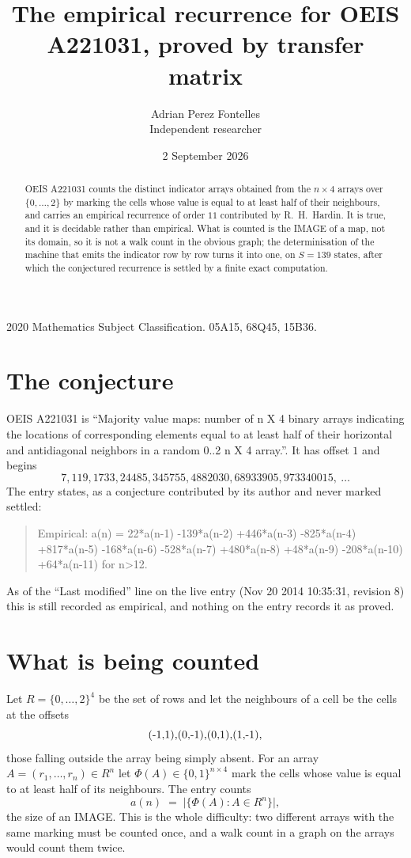 \documentclass[11pt,a4paper]{article}
\title{The empirical recurrence for OEIS A221031, proved by transfer matrix}
\author{Adrian Perez Fontelles\\ \small Independent researcher}
\date{2 September 2026}
\theoremstyle{plain}
\theoremstyle{definition}
\begin{document}
\maketitle

\begin{abstract}
OEIS A221031 counts the distinct indicator arrays obtained from the $n\times4$ arrays over
$\{0,\dots,2\}$ by marking the cells whose value is equal to at least half of their neighbours, and carries an
empirical recurrence of order $11$ contributed by R.~H.~Hardin. It is true, and it is
decidable rather than empirical. What is counted is the IMAGE of a map, not its domain, so it
is not a walk count in the obvious graph; the determinisation of the machine that emits the
indicator row by row turns it into one, on $S=139$ states, after which the conjectured
recurrence is settled by a finite exact computation.
\end{abstract}

\noindent\small 2020 Mathematics Subject Classification. 05A15, 68Q45, 15B36.\normalsize

\section{The conjecture}

OEIS A221031 is ``Majority value maps: number of n X 4 binary arrays indicating the locations of corresponding elements equal to at least half of their horizontal and antidiagonal neighbors in a random 0..2 n X 4 array.''. It has offset $1$ and begins
\[
7, 119, 1733, 24485, 345755, 4882030, 68933905, 973340015,\ \dots
\]
The entry states, as a conjecture contributed by its author and never marked settled:
\begin{quote}
Empirical: a(n) = 22*a(n-1) -139*a(n-2) +446*a(n-3) -825*a(n-4) +817*a(n-5) -168*a(n-6) -528*a(n-7) +480*a(n-8) +48*a(n-9) -208*a(n-10) +64*a(n-11) for n>12.
\end{quote}
As of the ``Last modified'' line on the live entry (Nov 20 2014 10:35:31, revision 8) this is still
recorded as empirical, and nothing on the entry records it as proved.

\section{What is being counted}

Let $R=\{0,\dots,2\}^{4}$ be the set of rows and let the neighbours of a cell be the
cells at the offsets
\[
$(-1,1)$, $(0,-1)$, $(0,1)$, $(1,-1)$,
\]
those falling outside the array being simply absent. For an array
$A=(r_1,\dots,r_n)\in R^n$ let $\Phi(A)\in\{0,1\}^{n\times4}$ mark the cells whose value
is equal to at least half of its neighbours. The entry counts
\[
a(n)\;=\;\bigl|\{\Phi(A):A\in R^n\}\bigr| ,
\]
the size of an IMAGE. This is the whole difficulty: two different arrays with the same marking
must be counted once, and a walk count in a graph on the arrays would count them twice.
\end{document}
